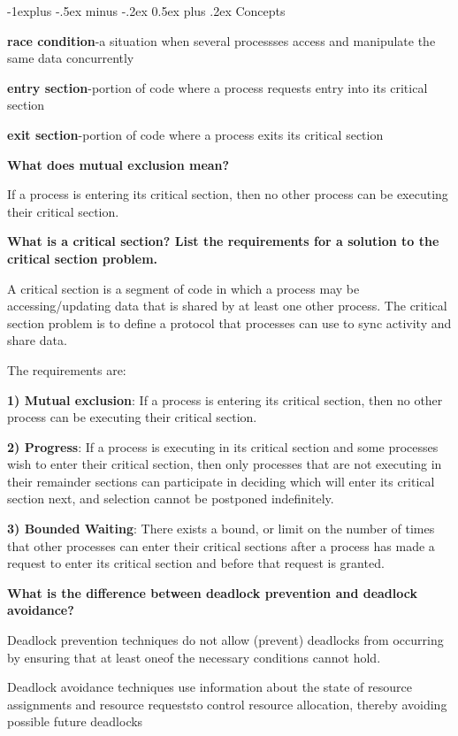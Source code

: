 \documentclass[8pt,landscape]{article}
\makeatletter
\renewcommand{\subsection}{\@startsection{subsection}{2}{0mm}%
                                {-1explus -.5ex minus -.2ex}%
                                {0.5ex plus .2ex}%
                                {\normalfont\scriptsize\bfseries}}
\makeatother
\begin{document}
\begin{multicols}{3}
\begin{tiny}
\subsection{Concepts}

\textbf{race condition}-a situation when several processses access and manipulate the same data
concurrently

\textbf{entry section}-portion of code where a process requests entry into its critical section

\textbf{exit section}-portion of code where a process exits its critical section

\textbf{What does mutual exclusion mean?}

If a process is entering its critical section, then no other process can be executing their 
critical section.

\textbf{What is a critical section? List the requirements for a solution to the critical section 
problem.}

A critical section is a segment of code in which a process may be accessing/updating data that is
shared by at least one other process. The critical section problem is to define a protocol that 
processes can use to sync activity and share data.

The requirements are:

\textbf{1) Mutual exclusion}: If a process is entering its critical section, then no other 
process can be executing their critical section.

\textbf{2) Progress}: If a process is executing in its critical section and some processes wish 
to enter their critical section, then only processes that are not executing in their remainder 
sections can participate in deciding which will enter its critical section next, and selection 
cannot be postponed indefinitely.

\textbf{3) Bounded Waiting}: There exists a bound, or limit on the number of times that other 
processes can enter their critical sections after a process has made a request to enter its 
critical section and before that request is granted.


\textbf{What is the difference between deadlock prevention and deadlock avoidance?}

Deadlock prevention techniques do not allow (prevent) deadlocks from occurring by ensuring that at least oneof the necessary conditions cannot hold.

Deadlock avoidance techniques use information about the state of resource assignments and resource requeststo control resource allocation, thereby avoiding possible future deadlocks


\end{tiny}
\end{multicols}
\end{document}
